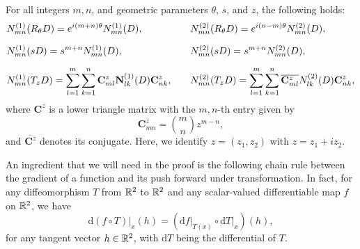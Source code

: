\begin{proposition}
\label{prop:complex-cgpt-under}
  For all integers $m,n$, and geometric parameters $\theta$, $s$, and $z$, the following
  holds:
  \begin{alignat}{2}
    &N_{mn}^{(1)}(R_\theta D)  = e^{i(m+n)\theta}N_{mn}^{(1)}(D), \quad
    &&N_{mn}^{(2)}(R_\theta D) = e^{i(n-m)\theta}N_{mn}^{(2)}(D),    \label{eq:CGPT_rot_Nt}\\
    \nm
    &N_{mn}^{(1)}(sD)  = {s^{m+n}}N_{mn}^{(1)}(D),   \quad
    &&N_{mn}^{(2)}(sD) = {s^{m+n}}N_{mn}^{(2)}(D),    \label{eq:CGPT_scl_Nt}\\
    \nm
    &N_{mn}^{(1)}(T_zD)  = \sum_{l=1}^m \sum_{k=1}^n \mathbf{C}^z_{ml}\No_{lk}(D) \mathbf{C}^z_{nk},
    \quad
    &&N_{mn}^{(2)}(T_zD) = \sum_{l=1}^m \sum_{k=1}^n \overline{\mathbf{C}^z_{ml}}N_{lk}^{(2)}(D) \mathbf{C}^z_{nk},    \label{eq:CGPT_trans_Nt}
  \end{alignat}
  where $\mathbf{C}^z$ is a lower triangle matrix with the $m,n$-th entry given
  by
  \begin{equation} \label{defcz}
  \mathbf{C}^z_{mn}= \binom{m}{n}  z^{m-n},
  \end{equation}
  and $\overline{\mathbf{C}^z}$ denotes its conjugate. Here, we
  identify $z=(z_1,z_2)$ with $z= z_1 + i z_2$.
\end{proposition}

An ingredient that we will need in the proof is the following
chain rule between the gradient of a function and its push forward
under transformation.  In fact, for any diffeomorphism $T$ from
$\R^2$ to $\R^2$ and any scalar-valued differentiable map $f$ on
$\R^2$, we have
\begin{equation}
\textrm{d} (f\circ T) \big|_x (h) = \left(\textrm{d} f
\big|_{T(x)} \circ \textrm{d}T\big|_x \right) (h),
\label{eq:chainrule}
\end{equation}
for any tangent vector $h \in \R^2$, with $\textrm{d}T$ being the
differential of $T$.

